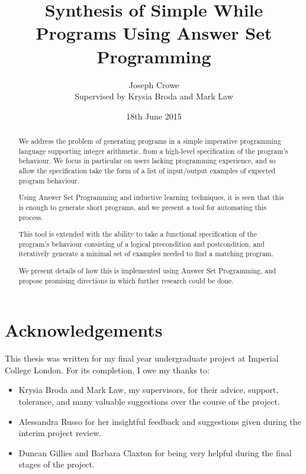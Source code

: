 \documentclass[a4paper,twoside,notitlepage]{report}
\begin{document}
\title{Synthesis of Simple While Programs Using Answer Set Programming}
\author{Joseph Crowe \\ Supervised by Krysia Broda and Mark Law}
\date{18th June 2015}
\maketitle

\vfill

\begin{abstract}
We address the problem of generating programs in a simple imperative 
programming language supporting integer arithmetic, from a high-level 
specification of the program's behaviour. We focus in particular on users 
lacking programming experience, and so allow the specification take the 
form of a list of input/output examples of expected program behaviour.

Using Answer Set Programming and inductive learning techniques, it is seen 
that this is enough to generate short programs, and we present a tool for 
automating this process.

This tool is extended with the ability to take a functional specification 
of the program's behaviour consisting of a logical precondition and 
postcondition, and iteratively generate a minimal set of examples needed 
to find a matching program.

We present details of how this is implemented using Answer Set Programming, and propose 
promising directions in which further research could be done.
\end{abstract}

\vfill
\vfill

\clearpage

\section*{Acknowledgements}
This thesis was written for my final year undergraduate project at 
Imperial College London. For its completion, I owe my thanks to:
\begin{itemize}
    \item Krysia Broda and Mark Law, my supervisors, for their advice, 
    support, tolerance, and many valuable suggestions over the course of 
    the project.
    \item Alessandra Russo for her insightful feedback and suggestions 
    given during the interim project review.
    \item Duncan Gillies and Barbara Claxton for being very helpful during 
    the final stages of the project.
\end{itemize}
\clearpage
\end{document}
